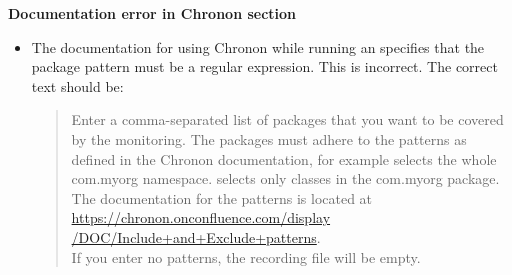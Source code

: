\textbf{Documentation error in Chronon section}
\begin{itemize}
\item The documentation for using Chronon while running an \gdaut{} specifies that the package pattern must be a regular expression. This is incorrect. The correct text should be: 
\begin{quote}Enter a comma-separated list of packages that you want to be covered by the monitoring. The packages must adhere to the patterns as defined in the Chronon documentation, for example  selects the whole com.myorg namespace.  selects only classes in the com.myorg package. The documentation for the patterns is located at \\
\href{https://chronon.onconfluence.com/display/DOC/Include+and+Exclude+patterns}{https://chronon.onconfluence.com/display\\
/DOC/Include+and+Exclude+patterns}.\\
 If you enter no patterns, the recording file will be empty.
\end{quote}
\end{itemize}

